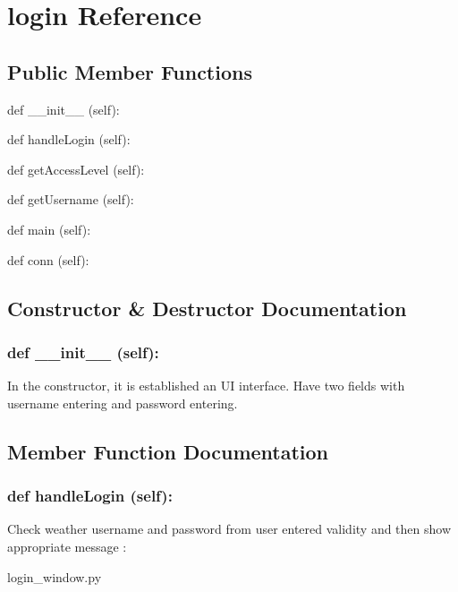 \hypertarget{login}{\section{login Reference}
\label{login}
}
\subsection*{Public Member Functions}
\begin{DoxyCompactItemize}
\item 
def {\_\_init\_\_} (self):
\item 
def {handleLogin} (self):
\item 
def {getAccessLevel} (self):
\item 
def {getUsername} (self):
\item 
def {main} (self):
\item 
def {conn} (self):
\end{DoxyCompactItemize}

\subsection{Constructor \& Destructor Documentation}
\hypertarget{class_poly_aa3def076b74bed67904976ad4f9fe9b1}{
\subsubsection[{def __init__ (self):}]{\setlength{\rightskip}{0pt plus 5cm}def {\_\_init\_\_} (self): 
}}
In the constructor, it is established an UI interface. Have two fields with username entering and password entering.

\subsection{Member Function Documentation}
\hypertarget{class_poly_a14a7ad77ce612b0c54f531d307ee4b39}{
\subsubsection[{def handleLogin (self):}]{\setlength{\rightskip}{0pt plus 5cm}def {handleLogin} (self):}}\label{class_poly_a14a7ad77ce612b0c54f531d307ee4b39}
Check weather username and password from user entered validity and then show appropriate message
:\begin{DoxyCompactItemize}
\item 
login\_window.\-py\end{DoxyCompactItemize}

